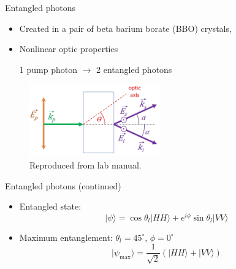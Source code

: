 \documentclass{../talk}
\newcommand{\ket}[1]{| #1 \rangle}
\renewcommand{\deg}{^\circ}
\begin{document}
\begin{frame}{Entangled photons}
  \begin{itemize}
    \item Created in a pair of beta barium borate (BBO) crystals,
    \item Nonlinear optic properties
      \begin{center}
        1 pump photon $\to$ 2 entangled photons
      \end{center}
  \end{itemize}
  \begin{figure}
    \centering
    \includegraphics[width=0.5\textwidth]{assets/photon-conversion.png}
    \caption{Reproduced from lab manual.}
  \end{figure}
\end{frame}

\begin{frame}{Entangled photons (continued)}
  \begin{itemize}
    \item Entangled state:
      \begin{equation}
        \ket{\psi} = \cos\theta_l \ket{HH} + e^{i\phi} \sin\theta_l \ket{VV}
      \end{equation}
    \item Maximum entanglement: $\theta_l = 45\deg$, $\phi = 0\deg$
      \begin{equation}
        \ket{\psi_\text{max}} = \frac{1}{\sqrt{2}} \left( \ket{HH} + \ket{VV} \right)
      \end{equation}
  \end{itemize}
\end{frame}
\end{document}
